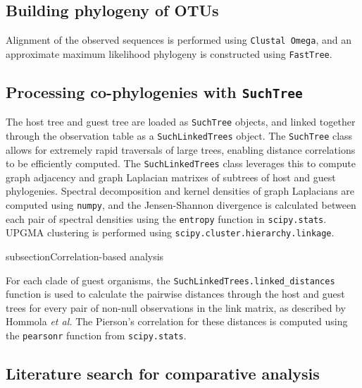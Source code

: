 \subsection{Building phylogeny of OTUs}

Alignment of the observed sequences is performed using {\tt Clustal Omega}, and an approximate maximum likelihood phylogeny is constructed using {\tt FastTree}.




\subsection{Processing co-phylogenies with {\tt SuchTree}}

The host tree and guest tree are loaded as {\tt SuchTree} objects, and linked together through the observation table as a {\tt SuchLinkedTrees} object. The {\tt SuchTree} class allows for extremely rapid traversals of large trees, enabling distance correlations to be efficiently computed. The {\tt SuchLinkedTrees} class leverages this to compute graph adjacency and graph Laplacian matrixes of subtrees of host and guest phylogenies. Spectral decomposition and kernel densities of graph Laplacians are computed using {\tt numpy}, and the Jensen-Shannon divergence is calculated between each pair of spectral densities using the {\tt entropy} function in {\tt scipy.stats}. UPGMA clustering is performed using {\tt scipy.cluster.hierarchy.linkage}.

subsection{Correlation-based analysis}

For each clade of guest organisms, the {\tt SuchLinkedTrees.linked\_distances} function is used to calculate the pairwise distances through the host and guest trees for every pair of non-null observations in the link matrix, as described by Hommola {\em et al.} \cite{hommola2009permutation} The Pierson's correlation for these distances is computed using the {\tt pearsonr} function from {\tt scipy.stats}.

\subsection{Literature search for comparative analysis}